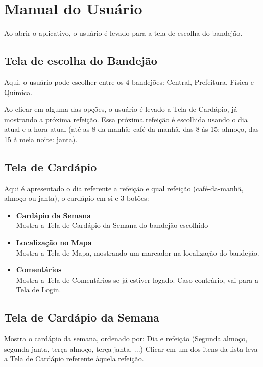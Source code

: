 





\cabecalho

\section{Manual do Usuário}
Ao abrir o aplicativo, o usuário é levado para a tela de escolha do bandejão.

\subsection{Tela de escolha do Bandejão}
Aqui, o usuário pode escolher entre os 4 bandejões: Central, Prefeitura, Física e Química.

Ao clicar em alguma das opções, o usuário é levado a Tela de Cardápio, já mostrando a próxima refeição. Essa próxima refeição é escolhida usando o dia atual e a hora atual (até as 8 da manhã: café da manhã, das 8 às 15: almoço, das 15 à meia noite: janta).

\subsection{Tela de Cardápio}
Aqui é apresentado o dia referente a refeição e qual refeição (café-da-manhã, almoço ou janta), o cardápio em si e 3 botões:
\begin{itemize}
\item \textbf{Cardápio da Semana} \\
Mostra a Tela de Cardápio da Semana do bandejão escolhido
\item \textbf{Localização no Mapa} \\
Mostra a Tela de Mapa, mostrando um marcador na localização do bandejão.
\item \textbf{Comentários} \\
Mostra a Tela de Comentários se já estiver logado. Caso contrário, vai para a Tela de Login.
\end{itemize}

\subsection{Tela de Cardápio da Semana}
Mostra o cardápio da semana, ordenado por: Dia e refeição (Segunda almoço, segunda janta, terça almoço, terça janta, ...)
Clicar em um dos itens da lista leva a Tela de Cardápio referente àquela refeição.


